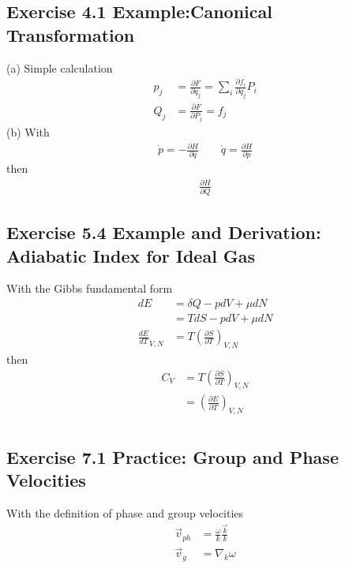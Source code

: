 \documentclass[10pt,a4paper]{book}
\theoremstyle{definition}
\begin{document}
\subsection{Exercise 4.1 Example:Canonical Transformation}
(a) Simple calculation
\begin{align}
p_j&=\frac{\partial F}{\partial q_j}=\sum_i\frac{\partial f_i}{\partial q_j}P_i\\
Q_j&=\frac{\partial F}{\partial P_j}=f_j
\end{align}
(b) With
\begin{align}
\dot{p}=-\frac{\partial H}{\partial q}\qquad
\dot{q}=\frac{\partial H}{\partial p}
\end{align}
then
\begin{align}
\frac{\partial H}{\partial Q}
\end{align}

\subsection{Exercise 5.4 Example and Derivation: Adiabatic Index for Ideal Gas}
With the Gibbs fundamental form 
\begin{align}
dE&=\delta Q-pdV+\mu dN\\
&=TdS-pdV+\mu dN\\
\frac{dE}{dT}_{V,N}&=T\left(\frac{\partial S}{\partial T}\right)_{V,N}
\end{align}
then
\begin{align}
C_V&=T\left(\frac{\partial S}{\partial T}\right)_{V,N}\\
&=\left(\frac{\partial E}{\partial T}\right)_{V,N}\\
\end{align}

\subsection{Exercise 7.1 Practice: Group and Phase Velocities}
With the definition of phase and group velocities
\begin{align}
    \vec{v}_{ph}&=\frac{\omega}{k}\frac{\vec{k}}{k}\\
    \vec{v}_{g}&=\nabla_k{\omega}
\end{align}
\end{document}
